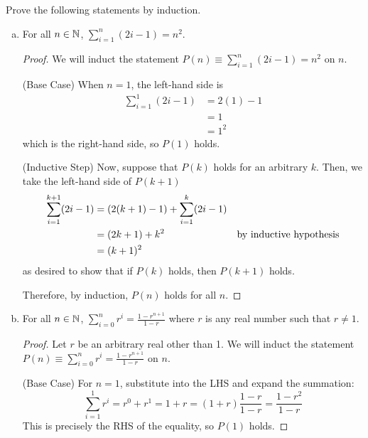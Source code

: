 \documentclass{agony}
\begin{document}
\question Prove the following statements by induction.
\begin{enumerate}[(a)]
  \item For all $n\in\mathbb{N}$, $\displaystyle \sum^n_{i=1} (2i-1) = n^2$.
        \begin{proof}
          We will induct the statement $P(n) \equiv \sum^n_{i=1} (2i-1) = n^2$ on $n$.

          (Base Case) When $n = 1$, the left-hand side is
          \begin{align*}
            \sum^1_{i=1} (2i-1) & = 2(1)-1 \\
                                & = 1      \\
                                & = 1^2
          \end{align*}
          which is the right-hand side, so $P(1)$ holds.

          (Inductive Step) Now, suppose that $P(k)$ holds for an arbitrary $k$.
          Then, we take the left-hand side of $P(k+1)$
          \begin{align*}
            \sum^{k+1}_{i=1} (2i-1)
             & = (2(k+1)-1) + \sum^k_{i=1} (2i-1) \\
             & = (2k+1) + k^2 & \text{by inductive hypothesis}                 \\
             & = (k+1)^2
          \end{align*}
          as desired to show that if $P(k)$ holds, then $P(k+1)$ holds.

          Therefore, by induction, $P(n)$ holds for all $n$.
        \end{proof}
  \item For all $n\in\mathbb{N}$, $\displaystyle \sum^n_{i=0} r^i = \frac{1-r^{n+1}}{1-r}$ where $r$ is any real number such that $r \neq 1$.
        \begin{proof}
          Let $r$ be an arbitrary real other than 1.
          We will induct the statement $P(n) \equiv \sum^n_{i=0} r^i = \frac{1-r^{n+1}}{1-r}$ on $n$.

          (Base Case) For $n=1$, substitute into the LHS and expand the summation:
          \begin{equation*}
            \sum^1_{i=1} r^i = r^0 + r^1 = 1 + r = (1+r)\frac{1-r}{1-r} = \frac{1-r^2}{1-r}
          \end{equation*}
          This is precisely the RHS of the equality, so $P(1)$ holds.


\end{proof}
\end{enumerate}
\end{document}

